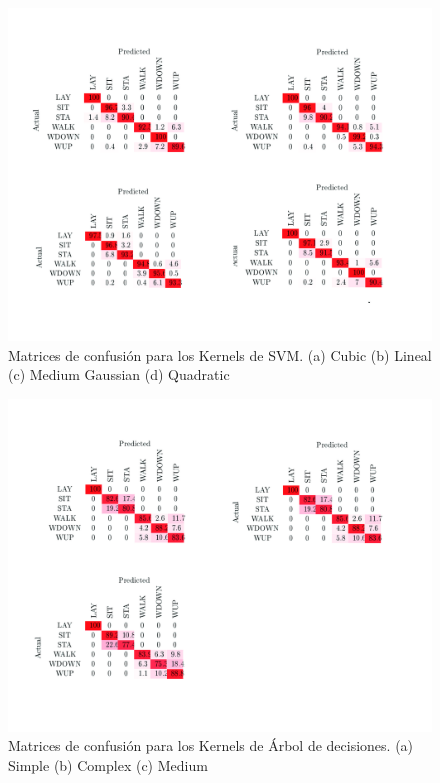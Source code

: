 \documentclass[11pt]{report}
\begin{document}
\begin{figure}[H]
  \centering
    \includegraphics[width=1.0\textwidth]{svm}
\caption{Matrices de confusión para los Kernels de SVM. (a) Cubic (b) Lineal (c) Medium Gaussian (d) Quadratic}
\end{figure}

\begin{figure}[H]
  \centering
    \includegraphics[width=1.0\textwidth]{dt}
\caption{Matrices de confusión para los Kernels de Árbol de decisiones. (a) Simple (b) Complex (c) Medium}
\end{figure}
\end{document}
